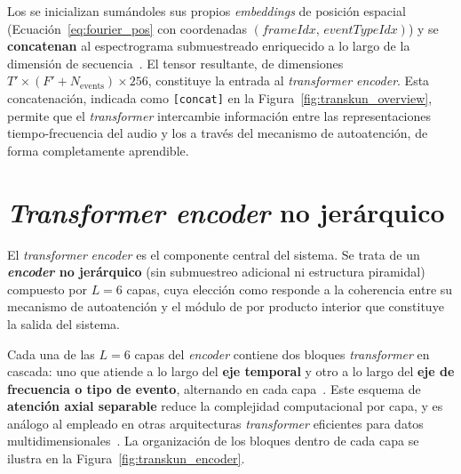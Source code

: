 \documentclass[11pt,spanish,listoffigures,listoftables]{tfgetsinf}
\begin{document}
Los  se inicializan sumándoles sus propios
\textit{embeddings} de posición espacial (Ecuación~\ref{eq:fourier_pos} con coordenadas
$(\textit{frameIdx},\, \textit{eventTypeIdx})$) y se \textbf{concatenan} al
espectrograma submuestreado enriquecido a lo largo de la dimensión de
secuencia~\cite{yan2024transkun}. El tensor resultante, de dimensiones
$T' \times (F' + N_{\text{events}}) \times 256$, constituye la entrada al
\textit{transformer encoder}. Esta concatenación, indicada como \texttt{[concat]} en la
Figura~\ref{fig:transkun_overview}, permite que el \textit{transformer} intercambie
información entre las representaciones tiempo-frecuencia del audio y los
 a través del mecanismo de autoatención, de
forma completamente aprendible.


\section{\textit{Transformer encoder} no jerárquico}
\label{sec:transkun_encoder}

El \textit{transformer} \textit{encoder} es el componente central del sistema. Se trata de un
\textbf{\textit{encoder} no jerárquico} (sin submuestreo adicional ni estructura
piramidal) compuesto por $L = 6$ capas, cuya elección como  responde 
a la coherencia entre su mecanismo de autoatención y el módulo de  por producto 
interior que constituye la salida del sistema.


Cada una de las $L = 6$ capas del \textit{encoder} contiene dos bloques
\textit{transformer} en cascada: uno que atiende a lo largo del \textbf{eje temporal}
y otro a lo largo del \textbf{eje de frecuencia o tipo de evento}, alternando en
cada capa~\cite{yan2024transkun}. Este esquema de \textbf{atención axial
separable} reduce la complejidad computacional por capa, y es análogo al empleado en
otras arquitecturas \textit{transformer} eficientes para datos
multidimensionales~\cite{ho2019axial,ristea2022septr}. La organización de los
bloques dentro de cada capa se ilustra en la
Figura~\ref{fig:transkun_encoder}.
\end{document}
